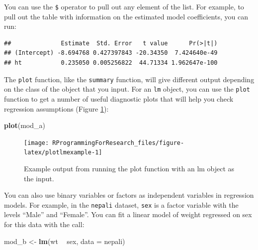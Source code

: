 \documentclass[]{book}
\makeatletter
\newenvironment{Shaded}{\begin{snugshade}}{\end{snugshade}}
\newcommand{\KeywordTok}[1]{\textcolor[rgb]{0.13,0.29,0.53}{\textbf{#1}}}
\newcommand{\DataTypeTok}[1]{\textcolor[rgb]{0.13,0.29,0.53}{#1}}
\newcommand{\StringTok}[1]{\textcolor[rgb]{0.31,0.60,0.02}{#1}}
\newcommand{\OperatorTok}[1]{\textcolor[rgb]{0.81,0.36,0.00}{\textbf{#1}}}
\newcommand{\NormalTok}[1]{#1}
\newenvironment{kframe}{%
\medskip{}
\setlength{\fboxsep}{.8em}
 \def\at@end@of@kframe{}%
 \ifinner\ifhmode%
  \def\at@end@of@kframe{\end{minipage}}%
  \begin{minipage}{\columnwidth}%
 \fi\fi%
 \def\FrameCommand##1{\hskip\@totalleftmargin \hskip-\fboxsep
 \colorbox{shadecolor}{##1}\hskip-\fboxsep
     \hskip-\linewidth \hskip-\@totalleftmargin \hskip\columnwidth}%
 \MakeFramed {\advance\hsize-\width
   \@totalleftmargin\z@ \linewidth\hsize
   \@setminipage}}%
 {\par\unskip\endMakeFramed%
 \at@end@of@kframe}
\renewenvironment{Shaded}{\begin{kframe}}{\end{kframe}}
\theoremstyle{definition}
\theoremstyle{definition}
\theoremstyle{definition}
\theoremstyle{remark}
\makeatother
\begin{document}
You can use the \texttt{\$} operator to pull out any element of the
list. For example, to pull out the table with information on the
estimated model coefficients, you can run:

\begin{Shaded}
\end{Shaded}

\begin{verbatim}
##              Estimate  Std. Error   t value      Pr(>|t|)
## (Intercept) -8.694768 0.427397843 -20.34350  7.424640e-49
## ht           0.235050 0.005256822  44.71334 1.962647e-100
\end{verbatim}

The \texttt{plot} function, like the \texttt{summary} function, will
give different output depending on the class of the object that you
input. For an \texttt{lm} object, you can use the \texttt{plot} function
to get a number of useful diagnostic plots that will help you check
regression assumptions (Figure \ref{fig:plotlmexample}):

\begin{Shaded}
\begin{Highlighting}[]
\KeywordTok{plot}\NormalTok{(mod_a)}
\end{Highlighting}
\end{Shaded}

\begin{figure}

{\centering \texttt{[image: RProgrammingForResearch\_files/figure-latex/plotlmexample-1]} 

}

\caption{Example output from running the plot function with an lm object as the input.}\label{fig:plotlmexample}
\end{figure}

You can also use binary variables or factors as independent variables in
regression models. For example, in the \texttt{nepali} dataset,
\texttt{sex} is a factor variable with the levels ``Male'' and
``Female''. You can fit a linear model of weight regressed on sex for
this data with the call:

\begin{Shaded}
\begin{Highlighting}[]
\NormalTok{mod_b <-}\StringTok{ }\KeywordTok{lm}\NormalTok{(wt }\OperatorTok{~}\StringTok{ }\NormalTok{sex, }\DataTypeTok{data =}\NormalTok{ nepali)}
\end{Highlighting}
\end{Shaded}
\end{document}
